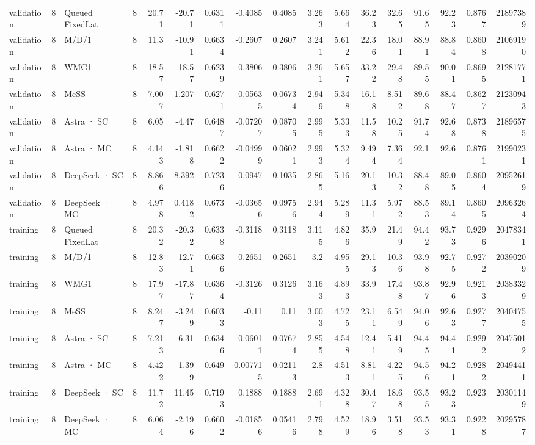 \begin{tabular}{lrlrrrrrrrrrrrrrr}
validation & 8 & Queued FixedLat & 8 & 20.71 & -20.71 & 0.6311 & -0.4085 & 0.4085 & 3.263 & 5.664 & 36.23 & 32.65 & 91.65 & 92.23 & 0.8767 & 21897389 \\
validation & 8 & M/D/1 & 8 & 11.3 & -10.91 & 0.6634 & -0.2607 & 0.2607 & 3.241 & 5.612 & 22.36 & 18.01 & 88.91 & 88.84 & 0.8608 & 21069190 \\
validation & 8 & WMG1 & 8 & 18.57 & -18.57 & 0.6239 & -0.3806 & 0.3806 & 3.261 & 5.657 & 33.22 & 29.48 & 89.55 & 90.01 & 0.8695 & 21281771 \\
validation & 8 & MeSS & 8 & 7.007 & 1.207 & 0.6271 & -0.05635 & 0.06734 & 2.949 & 5.348 & 16.18 & 8.512 & 89.68 & 88.47 & 0.8627 & 21230943 \\
validation & 8 & Astra · SC & 8 & 6.05 & -4.47 & 0.6487 & -0.07207 & 0.08705 & 2.995 & 5.333 & 11.58 & 10.25 & 91.74 & 92.68 & 0.8738 & 21896575 \\
validation & 8 & Astra · MC & 8 & 4.143 & -1.818 & 0.6622 & -0.04999 & 0.06021 & 2.993 & 5.324 & 9.494 & 7.364 & 92.1 & 92.6 & 0.8761 & 21990231 \\
validation & 8 & DeepSeek · SC & 8 & 8.866 & 8.392 & 0.7236 & 0.0947 & 0.1035 & 2.865 & 5.16 & 20.13 & 10.32 & 88.48 & 89.05 & 0.8604 & 20952619 \\
validation & 8 & DeepSeek · MC & 8 & 4.978 & 0.4182 & 0.673 & -0.03656 & 0.09756 & 2.944 & 5.289 & 11.31 & 5.972 & 88.53 & 89.14 & 0.8605 & 20963264 \\
training & 8 & Queued FixedLat & 8 & 20.32 & -20.32 & 0.6338 & -0.3118 & 0.3118 & 3.115 & 4.826 & 35.9 & 21.49 & 94.42 & 93.73 & 0.9296 & 20478341 \\
training & 8 & M/D/1 & 8 & 12.83 & -12.71 & 0.6636 & -0.2651 & 0.2651 & 3.2 & 4.955 & 29.13 & 10.36 & 93.98 & 92.75 & 0.9272 & 20390209 \\
training & 8 & WMG1 & 8 & 17.97 & -17.87 & 0.6364 & -0.3126 & 0.3126 & 3.163 & 4.893 & 33.9 & 17.48 & 93.87 & 92.96 & 0.9213 & 20383329 \\
training & 8 & MeSS & 8 & 8.247 & -3.249 & 0.6033 & -0.11 & 0.11 & 3.003 & 4.725 & 23.11 & 6.549 & 94.06 & 92.63 & 0.9277 & 20404755 \\
training & 8 & Astra · SC & 8 & 7.213 & -6.31 & 0.6346 & -0.06011 & 0.07674 & 2.855 & 4.548 & 12.41 & 5.419 & 94.45 & 94.41 & 0.9292 & 20475012 \\
training & 8 & Astra · MC & 8 & 4.422 & -1.399 & 0.649 & 0.007715 & 0.02113 & 2.8 & 4.513 & 8.811 & 4.225 & 94.56 & 94.21 & 0.9282 & 20494411 \\
training & 8 & DeepSeek · SC & 8 & 11.72 & 11.45 & 0.7193 & 0.1888 & 0.1888 & 2.691 & 4.328 & 30.47 & 18.68 & 93.55 & 93.23 & 0.923 & 20301149 \\
training & 8 & DeepSeek · MC & 8 & 6.064 & -2.196 & 0.6602 & -0.01856 & 0.05416 & 2.798 & 4.529 & 18.96 & 3.518 & 93.53 & 93.31 & 0.9228 & 20295787 \\
\bottomrule
\end{tabular}
